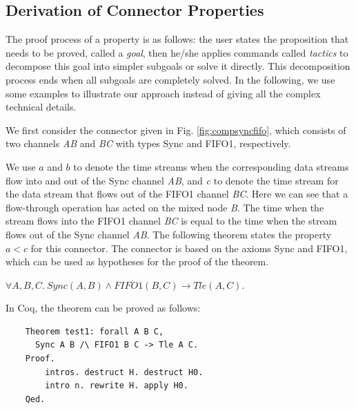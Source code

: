 \documentclass{llncs}
\begin{document}
\subsection{Derivation of Connector Properties}
The proof process of a property is as follows: the user states the proposition that needs to be proved, called a \emph{goal},
then he/she applies commands called \emph{tactics} to decompose this goal into simpler subgoals or solve it directly. This decomposition
process ends when all subgoals are completely solved. In the following, we use some examples to illustrate our approach instead of
giving all the complex technical details.
\begin{example}
We first consider the connector given in Fig. \ref{fig:compsyncfifo}, which consists of two channels \emph{AB} and \emph{BC} with types Sync and FIFO1, respectively.

We use $a$ and $b$ to denote the time streams when the corresponding data streams flow into and out of the Sync channel \emph{AB}, and
\emph{c} to denote the time stream for the data stream that flows out of the FIFO1 channel \emph{BC}. Here we can see that a flow-through
operation has acted on the mixed node \emph{B}. The time when the stream flows into the FIFO1 channel \emph{BC} is equal to the time when the
stream flows out of the Sync channel \emph{AB}. The following theorem states the property $a < c$ for this connector. The connector is based on the
axioms Sync and FIFO1, which can be used as hypotheses for the proof of the theorem.
\begin{theorem}\label{the:tleac}
$\forall A,B,C.\:Sync(A,B)\land FIFO1(B,C) \rightarrow Tle(A,C)$.
\end{theorem}

In Coq, the theorem can be proved as follows:
\begin{verbatim}
    Theorem test1: forall A B C,
      Sync A B /\ FIFO1 B C -> Tle A C.
    Proof.
        intros. destruct H. destruct H0.
        intro n. rewrite H. apply H0.
    Qed.
\end{verbatim}


\end{example}
\end{document}
